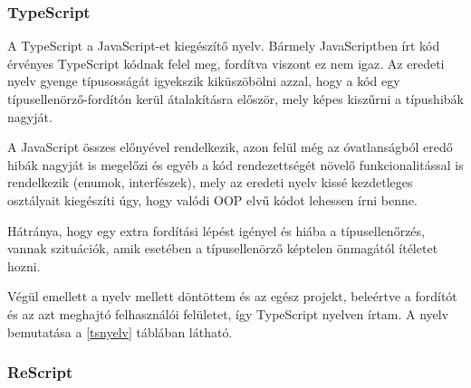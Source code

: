 
\subsubsection{TypeScript}

A TypeScript a JavaScript-et kiegészítő nyelv. Bármely JavaScriptben írt kód érvényes TypeScript kódnak felel meg, fordítva viszont ez nem igaz. Az eredeti nyelv gyenge típusosságát igyekszik kiküszöbölni azzal, hogy a kód egy típusellenörző-fordítón kerül átalakításra először, mely képes kiszűrni a típushibák nagyját.

A JavaScript összes előnyével rendelkezik, azon felül még az óvatlanságból eredő hibák nagyját is megelőzi és egyéb a kód rendezettségét növelő funkcionalitással is rendelkezik (enumok, interfészek), mely az eredeti nyelv kissé kezdetleges osztályait kiegészíti úgy, hogy valódi OOP elvű kódot lehessen írni benne.

Hátránya, hogy egy extra fordítási lépést igényel és hiába a típusellenőrzés, vannak szituációk, amik esetében a típusellenörző képtelen önmagától ítéletet hozni.

Végül emellett a nyelv mellett döntöttem és az egész projekt, beleértve a fordítót és az azt meghajtó felhasználói felületet, így TypeScript nyelven írtam. A nyelv bemutatása a \ref{tsnyelv} táblában látható.


\subsubsection{ReScript}

